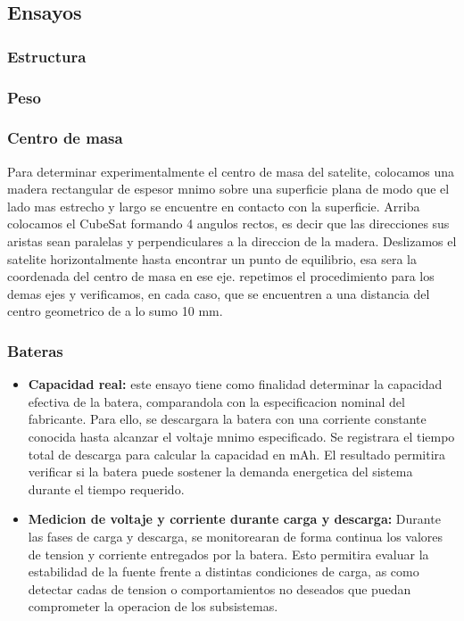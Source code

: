   \subsection{Ensayos}
    \subsubsection{Estructura}
    \subsubsection{Peso}
    \subsubsection{Centro de masa}
    Para determinar experimentalmente el centro de masa del satelite, colocamos una madera
    rectangular de espesor mnimo sobre una superficie plana de modo que el lado mas estrecho
    y largo se encuentre en contacto con la superficie. Arriba colocamos el CubeSat formando 4
    angulos rectos, es decir que las direcciones sus aristas sean paralelas y perpendiculares a la
    direccion de la madera. Deslizamos el satelite horizontalmente hasta encontrar un punto de
    equilibrio, esa sera la coordenada del centro de masa en ese eje. repetimos el procedimiento
    para los demas ejes y verificamos, en cada caso, que se encuentren a una distancia del centro
    geometrico de a lo sumo 10 mm.

    \subsubsection{Bateras}
    \begin{itemize}
      \item \textbf{Capacidad real:} este ensayo tiene como finalidad determinar la capacidad efectiva
      de la batera, comparandola con la especificacion nominal del fabricante. Para ello, se
      descargara la batera con una corriente constante conocida hasta alcanzar el voltaje
      mnimo especificado. Se registrara el tiempo total de descarga para calcular la capacidad en mAh. El resultado permitira verificar si la batera puede sostener la demanda
      energetica del sistema durante el tiempo requerido.

      \item \textbf{Medicion de voltaje y corriente durante carga y descarga:} Durante las fases de
      carga y descarga, se monitorearan de forma continua los valores de tension y corriente
      entregados por la batera. Esto permitira evaluar la estabilidad de la fuente frente a
      distintas condiciones de carga, as como detectar cadas de tension o comportamientos
      no deseados que puedan comprometer la operacion de los subsistemas.
    \end{itemize}

